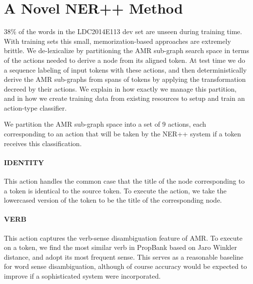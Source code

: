 \documentclass[11pt]{article}
\begin{document}


\section{A Novel NER++ Method}\label{sec:nerplusplus}
38\% of the words in the LDC2014E113 dev set are 
  unseen during training time. 
With training sets this small, memorization-based approaches are extremely brittle.
We de-lexicalize by partitioning the AMR sub-graph search space in terms of the actions needed to 
  derive a node from its aligned token. 
At test time we do a sequence labeling of input tokens with these actions, and 
  then deterministically derive the AMR sub-graphs from spans of tokens by applying 
  the transformation decreed by their actions. 
We explain in  how exactly we manage this partition, and in  how we create training data from existing resources to setup and train an action-type classifier.


We partition the AMR sub-graph space into a set of 9 actions, each corresponding to an action that will be taken by the NER++ system if a token receives this classification.

\paragraph{IDENTITY} This action handles the common case that the title of the node corresponding to a token is identical to the source token. To execute the action, we take the lowercased version of the token to be the title of the corresponding node.

\paragraph{VERB} This action captures the verb-sense disambiguation feature of AMR. To execute on a token, we find the most similar verb in PropBank based on Jaro Winkler distance, and adopt its most frequent sense.
This serves as a reasonable baseline for word sense disambiguation, although of
  course accuracy would be expected to improve if a sophisticated system were
  incorporated.
\end{document}
